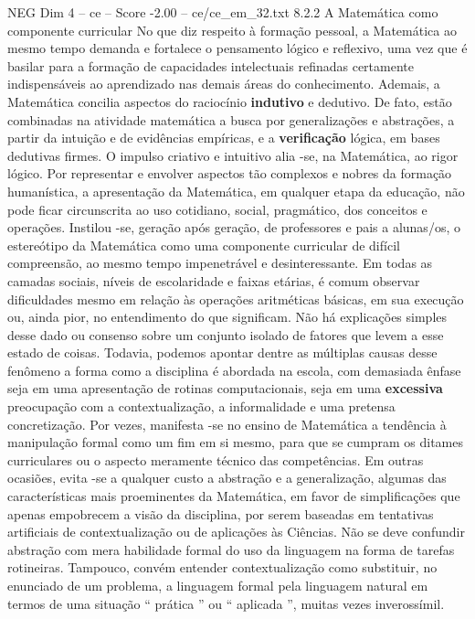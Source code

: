 \begin{textsample}{NEG Dim 4 – ce – Score -2.00 – ce/ce\_em\_32.txt}  \label{ex:f4_neg_153}
8.2.2 A Matemática como componente curricular No que diz respeito à formação pessoal, a Matemática ao mesmo tempo demanda e fortalece o pensamento lógico e reflexivo, uma vez que é basilar para a formação de capacidades intelectuais refinadas certamente indispensáveis ao aprendizado nas demais áreas do conhecimento.
Ademais, a Matemática concilia aspectos do raciocínio \textbf{indutivo} e dedutivo.
De fato, estão combinadas na atividade matemática a busca por generalizações e abstrações, a partir da intuição e de evidências empíricas, e a \textbf{verificação} lógica, em bases dedutivas firmes.
O impulso criativo e intuitivo alia -se, na Matemática, ao rigor lógico.
Por representar e envolver aspectos tão complexos e nobres da formação humanística, a apresentação da Matemática, em qualquer etapa da educação, não pode ficar circunscrita ao uso cotidiano, social, pragmático, dos conceitos e operações.
Instilou -se, geração após geração, de professores e pais a alunas/os, o estereótipo da Matemática como uma componente curricular de difícil compreensão, ao mesmo tempo impenetrável e desinteressante.
Em todas as camadas sociais, níveis de escolaridade e faixas etárias, é comum observar dificuldades mesmo em relação às operações aritméticas básicas, em sua execução ou, ainda pior, no entendimento do que significam.
Não há explicações simples desse dado ou consenso sobre um conjunto isolado de fatores que levem a esse estado de coisas.
Todavia, podemos apontar dentre as múltiplas causas desse fenômeno a forma como a disciplina é abordada na escola, com demasiada ênfase seja em uma apresentação de rotinas computacionais, seja em uma \textbf{excessiva} preocupação com a contextualização, a informalidade e uma pretensa concretização.
Por vezes, manifesta -se no ensino de Matemática a tendência à manipulação formal como um fim em si mesmo, para que se cumpram os ditames curriculares ou o aspecto meramente técnico das competências.
Em outras ocasiões, evita -se a qualquer custo a abstração e a generalização, algumas das características mais proeminentes da Matemática, em favor de simplificações que apenas empobrecem a visão da disciplina, por serem baseadas em tentativas artificiais de contextualização ou de aplicações às Ciências.
Não se deve confundir abstração com mera habilidade formal do uso da linguagem na forma de tarefas rotineiras.
Tampouco, convém entender contextualização como substituir, no enunciado de um problema, a linguagem formal pela linguagem natural em termos de uma situação “ prática ” ou “ aplicada ”, muitas vezes inverossímil.

\end{textsample}
